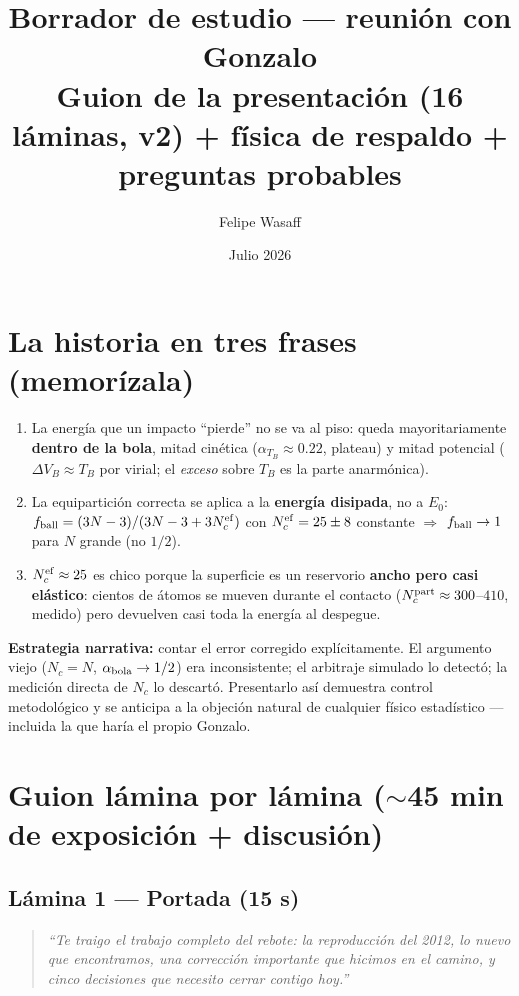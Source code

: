 \documentclass[11pt]{article}
\title{\vspace{-1.2cm}Borrador de estudio --- reunión con Gonzalo\\
\large Guion de la presentación (16 láminas, v2) + física de respaldo +
preguntas probables}
\author{Felipe Wasaff}
\date{Julio 2026}
\newcommand{\clave}[1]{\textcolor{red!60!black}{\textbf{#1}}}
\newcommand{\decir}[1]{\begin{quote}\itshape``#1''\end{quote}}
\begin{document}
\maketitle

\section*{La historia en tres frases (memorízala)}

\begin{enumerate}[leftmargin=1.6em]
    \item La energía que un impacto ``pierde'' no se va al piso: queda
    mayoritariamente \clave{dentro de la bola}, mitad cinética
    ($\alpha_{T_B}\approx0.22$, plateau) y mitad potencial
    ($\Delta V_B\approx T_B$ por virial; el \emph{exceso} sobre $T_B$
    es la parte anarmónica).
    \item La equipartición correcta se aplica a la \clave{energía
    disipada}, no a $E_0$:
    $f_{\rm ball}=(3N-3)/(3N-3+3N_c^{\rm ef})$ con
    $N_c^{\rm ef}=25\pm8$ constante $\Rightarrow$ $f_{\rm ball}\to1$
    para $N$ grande (no $1/2$).
    \item $N_c^{\rm ef}\approx25$ es chico porque la superficie es un
    reservorio \clave{ancho pero casi elástico}: cientos de átomos se
    mueven durante el contacto ($N_c^{\rm part}\approx300$--$410$,
    medido) pero devuelven casi toda la energía al despegue.
\end{enumerate}

\noindent\textbf{Estrategia narrativa:} contar el error corregido
explícitamente. El argumento viejo ($N_c=N$, $\alpha_{\rm bola}\to1/2$)
era inconsistente; el arbitraje simulado lo detectó; la medición directa
de $N_c$ lo descartó. Presentarlo así demuestra control metodológico y se
anticipa a la objeción natural de cualquier físico estadístico ---
incluida la que haría el propio Gonzalo.

\section{Guion lámina por lámina ($\sim$45 min de exposición + discusión)}

\subsection*{Lámina 1 --- Portada (15 s)}
\decir{Te traigo el trabajo completo del rebote: la reproducción del
2012, lo nuevo que encontramos, una corrección importante que hicimos en
el camino, y cinco decisiones que necesito cerrar contigo hoy.}
\end{document}
